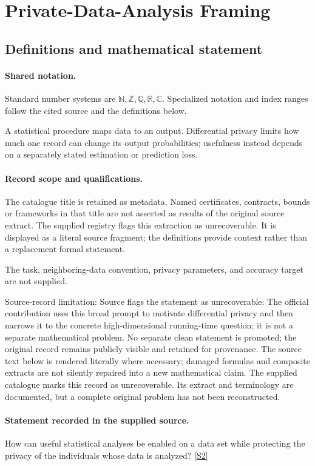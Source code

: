 \documentclass[11pt]{article}
\newcommand{\sref}[2]{\hyperlink{source:#1:#2}{[S#2]}}
\begin{document}
\section{Private-Data-Analysis Framing}\label{statement}

\subsection{Definitions and mathematical statement}

\paragraph{Shared notation.}Standard number systems are $\mathbb N,\mathbb Z,\mathbb Q,\mathbb R,\mathbb C$. Specialized notation and index ranges follow the cited source and the definitions below.


A statistical procedure maps data to an output. Differential privacy limits how much one record can change its output probabilities; usefulness instead depends on a separately stated estimation or prediction loss.
\paragraph{Record scope and qualifications.}
The catalogue title is retained as metadata. Named certificates, contracts, bounds or frameworks in that title are not asserted as results of the original source extract.
The supplied registry flags this extraction as unrecoverable. It is displayed as a literal source fragment; the definitions provide context rather than a replacement formal statement.

The task, neighboring-data convention, privacy parameters, and accuracy target are not supplied.

Source-record limitation: Source flags the statement as unrecoverable: The official contribution uses this broad prompt to motivate differential privacy and then narrows it to the concrete high-dimensional running-time question; it is not a separate mathematical problem. No separate clean statement is promoted; the original record remains publicly visible and retained for provenance.
The source text below is rendered literally where necessary; damaged formulas and composite extracts are not silently repaired into a new mathematical claim.
The supplied catalogue marks this record as unrecoverable. Its extract and terminology are documented, but a complete original problem has not been reconstructed.
\paragraph{Statement recorded in the supplied source.}
How can useful statistical analyses be enabled on a data set while protecting the privacy of the individuals whose data is analyzed? \sref{statement}{2}
\end{document}
